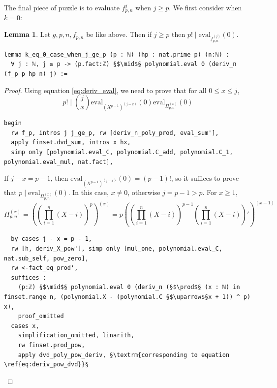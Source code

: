 \documentclass{report}
\theoremstyle{definition}
\newtheorem{lemma}{Lemma}[section]
\begin{document}
The final piece of puzzle is to evaluate $f_{p,n}^{j}$ when $j\ge p$. We first consider when $k=0$:
\begin{lemma}\label{lemma:ge_p0}
Let $g,p,n,f_{p,n}$ be like above. Then if $j\ge p$ then $p!\mid\mathrm{eval}_{f_{p,n}^{(j)}}(0)$.

\begin{verbatim}
lemma k_eq_0_case_when_j_ge_p (p : ℕ) (hp : nat.prime p) (n:ℕ) : 
  ∀ j : ℕ, j ≥ p -> (p.fact:ℤ) §$\mid$§ polynomial.eval 0 (deriv_n (f_p p hp n) j) :=
\end{verbatim}
\end{lemma}
\begin{proof}
Using equation \ref{eq:deriv_eval}, we need to prove that for all $0\le x\le j$, 
$$p!\mid {j\choose x}\mathrm{eval}_{(X^{p-1})^{(j-x)}}(0)\mathrm{eval}_{\Pi_{p,n}^{(x)}}(0)$$
\begin{verbatim}
begin
  rw f_p, intros j j_ge_p, rw [deriv_n_poly_prod, eval_sum'], 
  apply finset.dvd_sum, intros x hx, 
  simp only [polynomial.eval_C, polynomial.C_add, polynomial.C_1, polynomial.eval_mul, nat.fact],
\end{verbatim}

If $j-x=p-1$, then $\mathrm{eval}_{(X^{p-1})^{(j-x)}}(0)=(p-1)!$, so it suffices to prove that $p\mid\mathrm{eval}_{\Pi_{p,n}^{(x)}}(0)$. In this case, $x\ne 0$, otherwise $j=p-1>p$. For $x\ge 1$,
\begin{equation}\label{eq:deriv_pow_dvd}
\Pi_{p,n}^{(x)}=\left(\left(\prod_{i=1}^n(X-i)\right)^p\right)^{(x)}=p\left(\left(\prod_{i=1}^n(X-i)\right)^{p-1}\left(\prod_{i=1}^n(X-i)\right)'\right)^{(x-1)}
\end{equation}

\begin{verbatim}
  by_cases j - x = p - 1,
  rw [h, deriv_X_pow'], simp only [mul_one, polynomial.eval_C, nat.sub_self, pow_zero],
  rw <-fact_eq_prod',
  suffices : 
    (p:ℤ) §$\mid$§ polynomial.eval 0 (deriv_n (§$\prod$§ (x : ℕ) in finset.range n, (polynomial.X - (polynomial.C §$\uparrow$§x + 1)) ^ p) x),
    proof_omitted
  cases x,
    simplification_omitted, linarith,
    rw finset.prod_pow, 
    apply dvd_poly_pow_deriv, §\textrm{corresponding to equation \ref{eq:deriv_pow_dvd}}§
\end{verbatim}


\end{proof}
\end{document}
